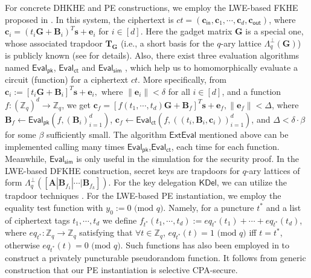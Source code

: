 \documentclass[runningheads,10pt]{llncs}
\begin{document}
For concrete  DHKHE and PE constructions, we employ the LWE-based FKHE proposed in \cite{BGG+14}. 
 In this system, the ciphertext is $ct= (\textbf{c}_{\textsf{in}}, \textbf{c}_1, \cdots, \textbf{c}_d,  \textbf{c}_{\textsf{out}})$, 
where  $\textbf{c}_{i}=(t_i\textbf{G}+\textbf{B}_i)^T \textbf{s}+\textbf{e}_{i}$ for $i\in [d]$.
 Here the gadget matrix $\textbf{G}$ is a special one,
whose associated trapdoor $\textbf{T}_\textbf{G}$ 
(i.e., a short basis  for the $q$-ary lattice $\Lambda_q^{\bot}(\textbf{G})$)  
is publicly known (see \cite{MP12} for details).  
Also, there exist three evaluation algorithms named 
$\textsf{Eval}_{\textsf{pk}}$, $\textsf{Eval}_{\textsf{ct}}$ and $\textsf{Eval}_{\textsf{sim}}$ \cite{BGG+14},
which help us to homomorphically evaluate a circuit (function) for a ciphertext $ct$.  
More specifically, from $\textbf{c}_i:=[t_i\textbf{G}+\textbf{B}_i]^T\textbf{s}+\textbf{e}_i, \text{ where } \| \textbf{e}_i \|<\delta $ 
for all  $i\in [d]$, and a function $f:(\mathbb{Z}_q)^d \rightarrow \mathbb{Z}_q$, 
we get $\textbf{c}_f=[f(t_1, \cdots, t_d)\textbf{G}+\textbf{B}_f]^T\textbf{s}+\textbf{e}_f, \| \textbf{e}_f \|<\Delta $,
where
$ \mathbf{B}_f \leftarrow\mathsf{Eval}_\mathsf{pk}(f, (\mathbf{B}_i )_{i=1}^d) $, 
$  \mathbf{c}_f \leftarrow \mathsf{Eval}_\mathsf{ct}(f, ((t_i, \mathbf{B}_i,\mathbf{c}_i))_{i=1}^d)$,  
and $\Delta < \delta \cdot \beta$ for some $\beta$ sufficiently small. 
The algorithm $\textsf{ExtEval}$ mentioned above can be implemented calling many times $\mathsf{Eval}_\mathsf{pk}$,$\textsf{Eval}_{\textsf{ct}}$, each time for each function. Meanwhile,
$\mathsf{Eval}_\mathsf{sim}$ is only useful in the simulation for the security proof.  In the LWE-based DFKHE construction, secret keys are trapdoors for $q$-ary lattices of form $\Lambda_q^{\bot}([\textbf{A}|\textbf{B}_{f_1}|\cdots| \textbf{B}_{f_k}])$.  For the key delegation $\mathsf{KDel}$, we can utilize the trapdoor techniques \cite{GPV08, ABB10, CHKP10} .
For the LWE-based PE instantiation, we employ the equality test function with $y_0:=0 \text{ (mod } q)$.  Namely, for a puncture $t^*$ and a list of ciphertext tags $t_1, \cdots, t_d$ we define $f_{t^*}(t_1, \cdots, t_d):=eq_{t^*}(t_1)+\cdots+ eq_{t^*}(t_d)$, where $eq_{t^*}: \mathbb{Z}_q\rightarrow \mathbb{Z}_q $ satisfying that $\forall t\in \mathbb{Z}_q$, $eq_{t^*}(t)=1 \text{ (mod } q)$ iff $t=t^*$,
otherwise $eq_{t^*}(t)=0 \text{ (mod } q)$. Such functions has also been employed in \cite{BKM17} to construct a privately puncturable pseudorandom function. It follows from generic construction that our PE instantiation is selective CPA-secure.\\
\end{document}
